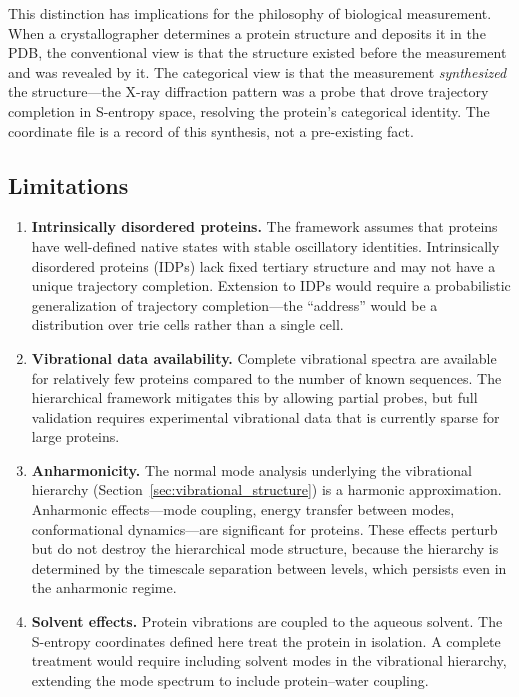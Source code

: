 \documentclass[11pt,twocolumn,a4paper]{article}
\theoremstyle{definition}
\theoremstyle{remark}
\begin{document}
This distinction has implications for the philosophy of biological measurement. When a crystallographer determines a protein structure and deposits it in the PDB, the conventional view is that the structure existed before the measurement and was revealed by it. The categorical view is that the measurement \emph{synthesized} the structure---the X-ray diffraction pattern was a probe that drove trajectory completion in S-entropy space, resolving the protein's categorical identity. The coordinate file is a record of this synthesis, not a pre-existing fact.

\subsection{Limitations}

\begin{enumerate}[nosep]
\item \textbf{Intrinsically disordered proteins.} The framework assumes that proteins have well-defined native states with stable oscillatory identities. Intrinsically disordered proteins (IDPs) lack fixed tertiary structure and may not have a unique trajectory completion. Extension to IDPs would require a probabilistic generalization of trajectory completion---the ``address'' would be a distribution over trie cells rather than a single cell.

\item \textbf{Vibrational data availability.} Complete vibrational spectra are available for relatively few proteins compared to the number of known sequences. The hierarchical framework mitigates this by allowing partial probes, but full validation requires experimental vibrational data that is currently sparse for large proteins.

\item \textbf{Anharmonicity.} The normal mode analysis underlying the vibrational hierarchy (Section~\ref{sec:vibrational_structure}) is a harmonic approximation. Anharmonic effects---mode coupling, energy transfer between modes, conformational dynamics---are significant for proteins. These effects perturb but do not destroy the hierarchical mode structure, because the hierarchy is determined by the timescale separation between levels, which persists even in the anharmonic regime.

\item \textbf{Solvent effects.} Protein vibrations are coupled to the aqueous solvent. The S-entropy coordinates defined here treat the protein in isolation. A complete treatment would require including solvent modes in the vibrational hierarchy, extending the mode spectrum to include protein--water coupling.
\end{enumerate}
\end{document}
